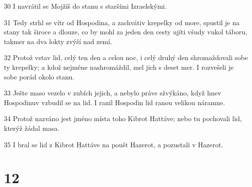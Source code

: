 \par 30 I navrátil se Mojžíš do stanu s staršími Izraelskými.
\par 31 Tedy strhl se vítr od Hospodina, a zachvátiv krepelky od more, spustil je na stany tak široce a dlouze, co by mohl za jeden den cesty ujíti všudy vukol táboru, takmer na dva lokty zvýší nad zemí.
\par 32 Protož vstav lid, celý ten den a celou noc, i celý druhý den shromaždovali sobe ty krepelky; a kdož nejméne nashromáždil, mel jich s deset mer. I rozvešeli je sobe porád okolo stanu.
\par 33 Ješte maso vezelo v zubích jejich, a nebylo práve sžvýkáno, když hnev Hospodinuv vzbudil se na lid. I ranil Hospodin lid ranou velikou náramne.
\par 34 Protož nazváno jest jméno místa toho Kibrot Hattáve; nebo tu pochovali lid, kterýž žádal masa.
\par 35 I bral se lid z Kibrot Hattáve na poušt Hazerot, a pozustali v Hazerot.

\chapter{12}

